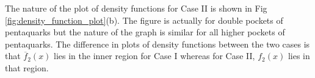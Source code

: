 \documentclass[fleqn]{article}
\begin{document}
            The nature of the plot of density functions for Case II is shown in Fig \ref{fig:density_function_plot}(b).  The figure is actually for double pockets of pentaquarks but the nature of the graph is similar for all higher pockets of pentaquarks. The difference in plots of density functions between the two cases is that $\overline{f}_{2}(x)$ lies in the inner region for Case I whereas for Case II, $f_{2}(x)$ lies in that region.    
        
            
\end{document}
